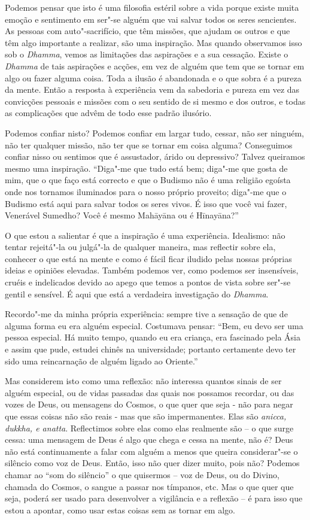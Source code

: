 Podemos pensar que isto é uma filosofia estéril sobre a vida porque
existe muita emoção e sentimento em ser"-se alguém que vai salvar todos
os seres sencientes. As pessoas com auto"-sacrifício, que têm missões,
que ajudam os outros e que têm algo importante a realizar, são uma
inspiração. Mas quando observamos isso sob o \emph{Dhamma}, vemos as
limitações das aspirações e a sua cessação. Existe o \emph{Dhamma} de
tais aspirações e acções, em vez de alguém que tem que se tornar em algo
ou fazer alguma coisa. Toda a ilusão é abandonada e o que sobra é a
pureza da mente. Então a resposta à experiência vem da sabedoria e
pureza em vez das convicções pessoais e missões com o seu sentido de si
mesmo e dos outros, e todas as complicações que advêm de todo esse
padrão ilusório.

Podemos confiar nisto? Podemos confiar em largar tudo, cessar, não ser
ninguém, não ter qualquer missão, não ter que se tornar em coisa alguma?
Conseguimos confiar nisso ou sentimos que é assustador, árido ou
depressivo? Talvez queiramos mesmo uma inspiração. ``Diga"-me que tudo
está bem; diga"-me que gosta de mim, que o que faço está correcto e que o
Budismo não é uma religião egoísta onde nos tornamos iluminados para o
nosso próprio proveito; diga"-me que o Budismo está aqui para salvar
todos os seres vivos. É isso que você vai fazer, Venerável Sumedho? Você
é mesmo Mahāyāna ou é Hīnayāna?''

O que estou a salientar é que a inspiração é uma experiência. Idealismo:
não tentar rejeitá"-la ou julgá"-la de qualquer maneira, mas reflectir
sobre ela, conhecer o que está na mente e como é fácil ficar iludido
pelas nossas próprias ideias e opiniões elevadas. Também podemos ver,
como podemos ser insensíveis, cruéis e indelicados devido ao apego que
temos a pontos de vista sobre ser"-se gentil e sensível. É aqui que está
a verdadeira investigação do \emph{Dhamma}.

Recordo"-me da minha própria experiência: sempre tive a sensação de que
de alguma forma eu era alguém especial. Costumava pensar: ``Bem, eu devo
ser uma pessoa especial. Há muito tempo, quando eu era criança, era
fascinado pela Ásia e assim que pude, estudei chinês na universidade;
portanto certamente devo ter sido uma reincarnação de alguém ligado ao
Oriente.''

Mas considerem isto como uma reflexão: não interessa quantos sinais de
ser alguém especial, ou de vidas passadas das quais nos possamos
recordar, ou das vozes de Deus, ou mensagens do Cosmos, o que quer que
seja - não para negar que essas coisas não são reais - mas que são
impermanentes. Elas são \emph{anicca, dukkha, e anatta}. Reflectimos
sobre elas como elas realmente são -- o que surge cessa: uma mensagem de
Deus é algo que chega e cessa na mente, não é? Deus não está
continuamente a falar com alguém a menos que queira considerar"-se o
silêncio como voz de Deus. Então, isso não quer dizer muito, pois não?
Podemos chamar ao ``som do silêncio'' o que quisermos -- voz de Deus, ou
do Divino, chamada do Cosmos, o sangue a passar nos tímpanos, etc. Mas o
que quer que seja, poderá ser usado para desenvolver a vigilância e a
reflexão -- é para isso que estou a apontar, como usar estas coisas sem
as tornar em algo.

